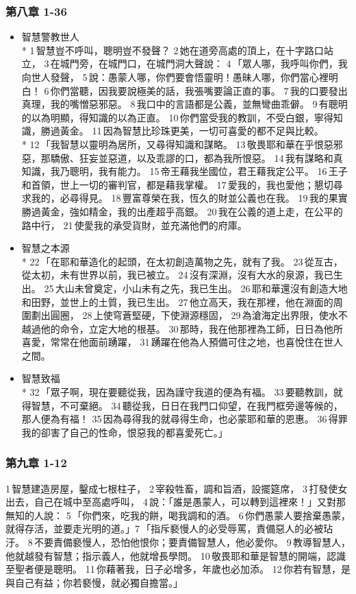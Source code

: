 \subsubsection{第八章 1-36} 
\begin{itemize}
\itemsep-.45em 
\item 智慧警教世人 \\*
1 智慧豈不呼叫，聰明豈不發聲？ 2 她在道旁高處的頂上，在十字路口站立， 3 在城門旁，在城門口，在城門洞大聲說： 4 「眾人哪，我呼叫你們，我向世人發聲， 5 說：愚蒙人哪，你們要會悟靈明！愚昧人哪，你們當心裡明白！ 6 你們當聽，因我要說極美的話，我張嘴要論正直的事。 7 我的口要發出真理，我的嘴憎惡邪惡。 8 我口中的言語都是公義，並無彎曲乖僻。 9 有聰明的以為明顯，得知識的以為正直。 10 你們當受我的教訓，不受白銀，寧得知識，勝過黃金。 11 因為智慧比珍珠更美，一切可喜愛的都不足與比較。\\*
12 「我智慧以靈明為居所，又尋得知識和謀略。 13 敬畏耶和華在乎恨惡邪惡，那驕傲、狂妄並惡道，以及乖謬的口，都為我所恨惡。 14 我有謀略和真知識，我乃聰明，我有能力。 15 帝王藉我坐國位，君王藉我定公平。 16 王子和首領，世上一切的審判官，都是藉我掌權。 17 愛我的，我也愛他；懇切尋求我的，必尋得見。 18 豐富尊榮在我，恆久的財並公義也在我。 19 我的果實勝過黃金，強如精金，我的出產超乎高銀。 20 我在公義的道上走，在公平的路中行， 21 使愛我的承受貨財，並充滿他們的府庫。
\item 智慧之本源\\*
22 「在耶和華造化的起頭，在太初創造萬物之先，就有了我。 23 從亙古，從太初，未有世界以前，我已被立。 24 沒有深淵，沒有大水的泉源，我已生出。 25 大山未曾奠定，小山未有之先，我已生出。 26 耶和華還沒有創造大地和田野，並世上的土質，我已生出。 27 他立高天，我在那裡，他在淵面的周圍劃出圓圈， 28 上使穹蒼堅硬，下使淵源穩固， 29 為滄海定出界限，使水不越過他的命令，立定大地的根基。 30 那時，我在他那裡為工師，日日為他所喜愛，常常在他面前踴躍， 31 踴躍在他為人預備可住之地，也喜悅住在世人之間。
\item 智慧致福\\*
32 「眾子啊，現在要聽從我，因為謹守我道的便為有福。 33 要聽教訓，就得智慧，不可棄絕。 34 聽從我，日日在我門口仰望，在我門框旁邊等候的，那人便為有福！ 35 因為尋得我的就尋得生命，也必蒙耶和華的恩惠。 36 得罪我的卻害了自己的性命，恨惡我的都喜愛死亡。」
\end{itemize}
\subsubsection{第九章 1-12} 
1 智慧建造房屋，鑿成七根柱子， 2 宰殺牲畜，調和旨酒，設擺筵席， 3 打發使女出去，自己在城中至高處呼叫， 4 說：「誰是愚蒙人，可以轉到這裡來！」又對那無知的人說： 5 「你們來，吃我的餅，喝我調和的酒。 6 你們愚蒙人要捨棄愚蒙，就得存活，並要走光明的道。」7 「指斥褻慢人的必受辱罵，責備惡人的必被玷汙。 8 不要責備褻慢人，恐怕他恨你；要責備智慧人，他必愛你。 9 教導智慧人，他就越發有智慧；指示義人，他就增長學問。 10 敬畏耶和華是智慧的開端，認識至聖者便是聰明。 11 你藉著我，日子必增多，年歲也必加添。 12 你若有智慧，是與自己有益；你若褻慢，就必獨自擔當。」
 

